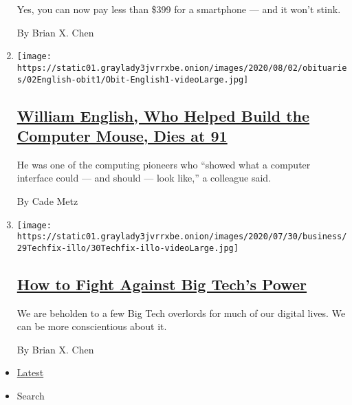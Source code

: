 \begin{enumerate}
  Yes, you can now pay less than \$399 for a smartphone --- and it won't
  stink.

  By Brian X. Chen
\item
  \texttt{[image: https://static01.graylady3jvrrxbe.onion/images/2020/08/02/obituaries/02English-obit1/Obit-English1-videoLarge.jpg]}

  \hypertarget{william-english-who-helped-build-the-computer-mouse-dies-at-91}{%
  \subsection{\texorpdfstring{\href{/2020/07/31/technology/william-english-who-helped-build-the-computer-mouse-dies-at-91.html}{William
  English, Who Helped Build the Computer Mouse, Dies at
  91}}{William English, Who Helped Build the Computer Mouse, Dies at 91}}\label{william-english-who-helped-build-the-computer-mouse-dies-at-91}}

  He was one of the computing pioneers who ``showed what a computer
  interface could --- and should --- look like,'' a colleague said.

  By Cade Metz
\item
  \texttt{[image: https://static01.graylady3jvrrxbe.onion/images/2020/07/30/business/29Techfix-illo/30Techfix-illo-videoLarge.jpg]}

  \hypertarget{how-to-fight-against-big-techs-power}{%
  \subsection{\texorpdfstring{\href{/2020/07/29/technology/personaltech/big-tech-power-how-to-fight.html}{How
  to Fight Against Big Tech's
  Power}}{How to Fight Against Big Tech's Power}}\label{how-to-fight-against-big-techs-power}}

  We are beholden to a few Big Tech overlords for much of our digital
  lives. We can be more conscientious about it.

  By Brian X. Chen
\end{enumerate}

\begin{itemize}
\tightlist
\item
  \protect\hyperlink{stream-panel}{Latest}
\item
  Search
\end{itemize}

